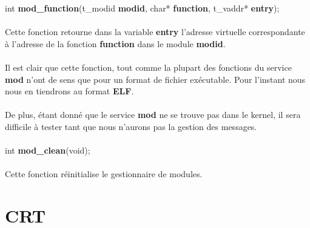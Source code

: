 \documentclass[10pt,a4wide]{article}
\begin{document}
\hspace{1.5cm}int \textbf{mod\_function}(t\_modid \textbf{modid},
                                         char* \textbf{function},
                                         t\_vaddr* \textbf{entry});

\paragraph{}

Cette fonction retourne dans la variable \textbf{entry} l'adresse virtuelle
correspondante \`a l'adresse de la fonction \textbf{function} dans le
module \textbf{modid}.

\paragraph{}

Il est clair que cette fonction, tout comme la plupart des fonctions du
service \textbf{mod} n'ont de sens que pour un format de fichier ex\'ecutable.
Pour l'instant nous nous en tiendrons au format \textbf{ELF}.

\paragraph{}

De plus, \'etant donn\'e que le service \textbf{mod} ne se trouve pas dans
le kernel, il sera difficile \`a tester tant que nous n'aurons pas la
gestion des messages.

\paragraph{}

\hspace{1.5cm}int \textbf{mod\_clean}(void);

\paragraph{}

Cette fonction r\'einitialise le gestionnaire de modules.

\section{CRT}

\paragraph{}
\end{document}
